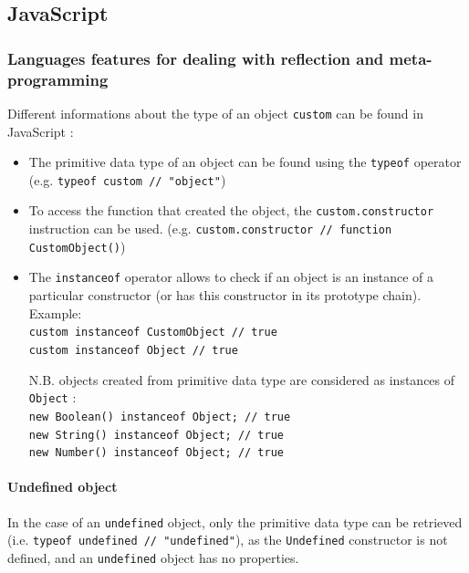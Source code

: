 \documentclass[a4paper,10pt]{article}
\begin{document}
\newpage
\subsection{JavaScript}

\setjs
\subsubsection{Languages features for dealing with reflection and meta-programming}

Different informations about the type of an object \lstinline|custom| can be found in JavaScript :
\begin{itemize}
\item The primitive data type of an object can be found using the \lstinline|typeof| operator (e.g. \lstinline|typeof custom // "object"|)

\item To access the function that created the object, the \lstinline|custom.constructor| instruction can be used. (e.g. \lstinline|custom.constructor // function CustomObject()|)

\item The \lstinline|instanceof| operator allows to check if an object is an instance of a particular constructor (or has this constructor in its prototype chain). \\
		Example: \\
		\lstinline|custom instanceof CustomObject // true| \\
		\lstinline|custom instanceof Object // true|

		\smallskip
		N.B. objects created from primitive data type are considered as instances of \lstinline|Object| : \\
		\lstinline|new Boolean() instanceof Object; // true| \\
		\lstinline|new String() instanceof Object; // true| \\
		\lstinline|new Number() instanceof Object; // true| \\
\end{itemize}


\paragraph{Undefined object}{
In the case of an \lstinline|undefined| object, only the primitive data type can be retrieved (i.e. \lstinline|typeof undefined // "undefined"|), as the \lstinline|Undefined| constructor is not defined, and an \lstinline|undefined| object has no properties.
}
\end{document}
